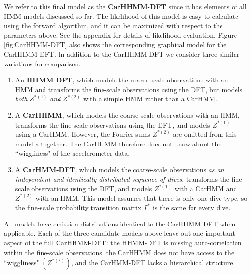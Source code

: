 We refer to this final model as the \textbf{CarHHMM-DFT} since it has elements of all HMM models discussed so far. The likelihood of this model is easy to calculate using the forward algorithm, and it can be maximized with respect to the parameters above. See the appendix for details of likelihood evaluation. Figure \ref{fig:CarHHMM-DFT} also shows the corresponding graphical model for the CarHHMM-DFT. In addition to the CarHHMM-DFT we consider three similar variations for comparison:
\begin{enumerate}
    \item An \textbf{HHMM-DFT}, which models the coarse-scale observations with an HMM and transforms the fine-scale observations using the DFT, but models \textit{both} $Z^{*(1)}$ \textit{and} $Z^{*(2)}$ with a simple HMM rather than a CarHMM.
    \item A \textbf{CarHHMM}, which models the coarse-scale observations with an HMM, transforms the fine-scale observations using the DFT, and models $Z^{*(1)}$ using a CarHMM. However, the Fourier sums $Z^{*(2)}$ are omitted from this model altogether. The CarHHMM therefore does not know about the ``wiggliness" of the accelerometer data.
    \item A \textbf{CarHMM-DFT}, which models the coarse-scale observations \textit{as an independent and identically distributed sequence of dives}, transforms the fine-scale observations using the DFT, and models $Z^{*(1)}$ with a CarHMM and $Z^{*(2)}$ with an HMM. This model assumes that there is only one dive type, so the fine-scale probability transition matrix $\Gamma^*$ is the same for every dive. 
\end{enumerate}
All models have emission distributions identical to the CarHHMM-DFT when applicable. Each of the three candidate models above leave out one important aspect of the full CarHHMM-DFT: the HHMM-DFT is missing auto-correlation within the fine-scale observations, the CarHHMM does not have access to the ``wiggliness" $(Z^{*(2)})$, and the CarHMM-DFT lacks a hierarchical structure.